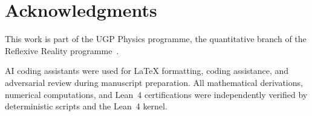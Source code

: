 \documentclass[12pt,letterpaper]{article}
\begin{document}
\section*{Acknowledgments}

This work is part of the UGP Physics programme, the quantitative branch of the Reflexive Reality programme~\cite{SpivackResearchProgrammes}.

AI coding assistants were used for LaTeX formatting, coding assistance, and adversarial review during manuscript preparation. All mathematical derivations, numerical computations, and Lean~4 certifications were independently verified by deterministic scripts and the Lean~4 kernel.



\end{document}
